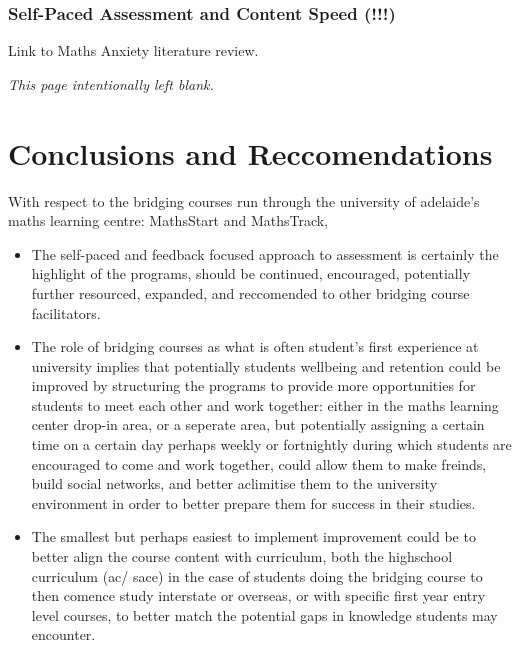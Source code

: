 \documentclass[twoside,12pt,a4paper]{report}
\makeatletter
\newcommand*{\intentionallyblankpage}{
  \vspace*{\fill}
  {\centering \textit{This page intentionally left blank.} \par}
  \vspace{\fill}}
\renewcommand*{\cleardoublepage}{\clearpage\if@twoside \ifodd\c@page\else
  \intentionallyblankpage
  \newpage
  \if@twocolumn\hbox{}\newpage\fi\fi\fi}
\makeatother
\begin{document}
\subsection{Self-Paced Assessment and Content Speed (!!!)}

Link to Maths Anxiety literature review.



\cleardoublepage
\chapter*{Conclusions and Reccomendations}

With respect to the bridging courses run through the university of adelaide's maths learning centre: MathsStart and MathsTrack,
\begin{itemize}
	\item The self-paced and feedback focused approach to assessment is certainly the highlight of the programs, should be continued, encouraged, potentially further resourced, expanded, and reccomended to other bridging course facilitators.
	\item The role of bridging courses as what is often student's first experience at university implies that potentially students wellbeing and retention could be improved by structuring the programs to provide more opportunities for students to meet each other and work together: either in the maths learning center drop-in area, or a seperate area, but potentially assigning a certain time on a certain day perhaps weekly or fortnightly during which students are encouraged to come and work together, could allow them to make freinds, build social networks, and better aclimitise them to the university environment in order to better prepare them for success in their studies.
	\item The smallest but perhaps easiest to implement improvement could be to better align the course content with curriculum, both the highschool curriculum (\gls{ac}/ \gls{sace}) in the case of students doing the bridging course to then comence study interstate or overseas, or with specific first year entry level courses, to better match the potential gaps in knowledge students may encounter.
\end{itemize}

\glsresetall

 
\end{document}
